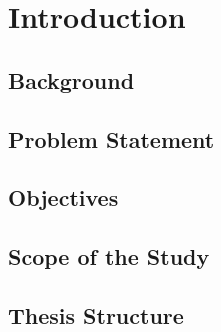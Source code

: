 \chapter{Introduction}

\setcounter{section}{0}
\section{Background}



\section{Problem Statement}


\section{Objectives}


\section{Scope of the Study}


\section{Thesis Structure}




